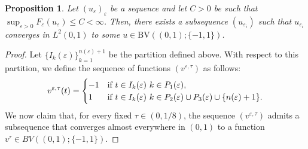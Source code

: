 \documentclass[10pt,a4paper]{amsart}
\newtheorem{proposition}{Proposition}
\newcommand{\BV}{\mathrm{BV}}
\begin{document}
\begin{proposition}\label{compactness}
Let $(u_{\varepsilon})_{\varepsilon}$ be a sequence and let $C>0$ be such that $\sup_{\varepsilon>0}F_{\varepsilon}(u_{\varepsilon})\le C<\infty$. Then, there exists a subsequence $(u_{\varepsilon_{i}})$ such that $u_{\varepsilon_{i}}$ converges in $L^{2}(0,1)$ to some $u\in\BV((0,1);\{-1,1\})$.
\end{proposition}

\begin{proof}
Let $\{I_{k}(\varepsilon)\}_{k=1}^{n(\varepsilon)+1}$ be the partition defined above. With respect to this partition, we define the sequence of functions $(v^{\varepsilon,\tau})$ as follows:
\begin{equation*}
v^{\varepsilon,\tau}(t) =
\begin{cases}
-1 & \hbox{if}\,\, t \in I_{k}({\varepsilon})\,\, k \in P_{1}(\varepsilon), \\
1 & \hbox{if}\,\, t \in I_{k}({\varepsilon})\,\, k \in P_{2}(\varepsilon)\cup P_{3}(\varepsilon)\cup\{n(\varepsilon)+1\}.
\end{cases}
\end{equation*}
We now claim that, for every fixed $\tau \in (0,1/8)$, the sequence $(v^{\varepsilon,\tau})$ admits a subsequence that converges almost everywhere in $(0,1)$ to a function $v^{\tau}\in BV((0,1);\{-1,1\})$.


\end{proof}
\end{document}
